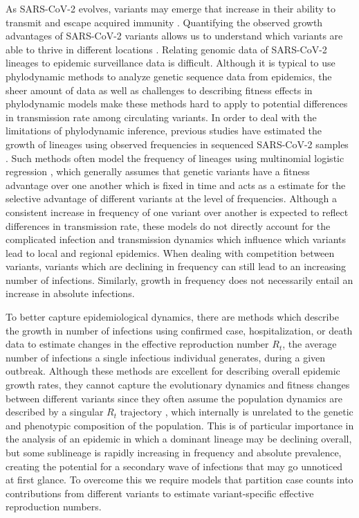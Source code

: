 \documentclass[11pt,oneside,letterpaper]{article}
\begin{document}
As SARS-CoV-2 evolves, variants may emerge that increase in their ability to transmit and escape acquired immunity \cite{tao2021biological}.
Quantifying the observed growth advantages of SARS-CoV-2 variants allows us to understand which variants are able to thrive in different locations \cite{tegally2021detection, davies2021estimated}.
Relating genomic data of SARS-CoV-2 lineages to epidemic surveillance data is difficult.
Although it is typical to use phylodynamic methods to analyze genetic sequence data from epidemics, the sheer amount of data as well as challenges to describing fitness effects in phylodynamic models make these methods hard to apply to potential differences in transmission rate among circulating variants.
In order to deal with the limitations of phylodynamic inference, previous studies have estimated the growth of lineages using observed frequencies in sequenced SARS-CoV-2 samples \cite{Annavajhala2021, Faria2021, Obermeyer2021, Ito2021}.
Such methods often model the frequency of lineages using multinomial logistic regression \cite{Ito2021, Obermeyer2021}, which generally assumes that genetic variants have a fitness advantage over one another which is fixed in time and acts as a estimate for the selective advantage of different variants at the level of frequencies.
Although a consistent increase in frequency of one variant over another is expected to reflect differences in transmission rate, these models do not directly account for the complicated infection and transmission dynamics which influence which variants lead to local and regional epidemics.
When dealing with competition between variants, variants which are declining in frequency can still lead to an increasing number of infections.
Similarly, growth in frequency does not necessarily entail an increase in absolute infections.

To better capture epidemiological dynamics, there are methods which describe the growth in number of infections using confirmed case, hospitalization, or death data to estimate changes in the effective reproduction number $R_{t}$, the average number of infections a single infectious individual generates, during a given outbreak.
Although these methods are excellent for describing overall epidemic growth rates, they cannot capture the evolutionary dynamics and fitness changes between different variants since they often assume the population dynamics are described by a singular $R_{t}$ trajectory \cite{Cori2013, Abbott2020}, which internally is unrelated to the genetic and phenotypic composition of the population.
This is of particular importance in the analysis of an epidemic in which a dominant lineage may be declining overall, but some sublineage is rapidly increasing in frequency and absolute prevalence, creating the potential for a secondary wave of infections that may go unnoticed at first glance.
To overcome this we require models that partition case counts into contributions from different variants to estimate variant-specific effective reproduction numbers.
\end{document}
